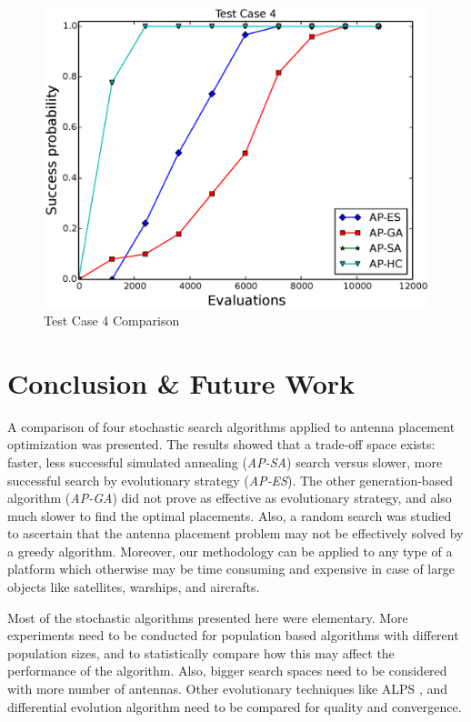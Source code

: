 \documentclass{sig-alternate}
\begin{document}
\begin{figure}
    \begin{center}
        \includegraphics[width=.49\textwidth]{FIG/tc4_sp.eps}
\end{center}
\caption{Test Case 4 Comparison}
\label{fig:tc4}
\end{figure}


\section{Conclusion \& Future Work}
\label{sec-conclusion}
A comparison of four stochastic search algorithms applied to antenna placement optimization was presented. The results showed that a trade-off space exists: faster, less successful simulated annealing (\textit{AP-SA}) search versus slower, more successful search by evolutionary strategy (\textit{AP-ES}). The other generation-based algorithm (\textit{AP-GA}) did not prove as effective as evolutionary strategy, and also much slower to find the optimal placements. Also, a random search was studied to ascertain that the antenna placement problem may not be effectively solved by a greedy algorithm. Moreover, our methodology can be applied to any type of a platform which otherwise may be time consuming and expensive in case of large objects like satellites, warships, and aircrafts. 

Most of the stochastic algorithms presented here were elementary. More experiments need to be conducted for population based algorithms with different population sizes, and to statistically compare how this may affect the performance of the algorithm. Also, bigger search spaces need to be considered with more number of antennas. Other evolutionary techniques like ALPS \cite{hornby2006alps}, and differential evolution algorithm \cite{pan2008discrete} need to be compared for quality and convergence.


 
\end{document}
